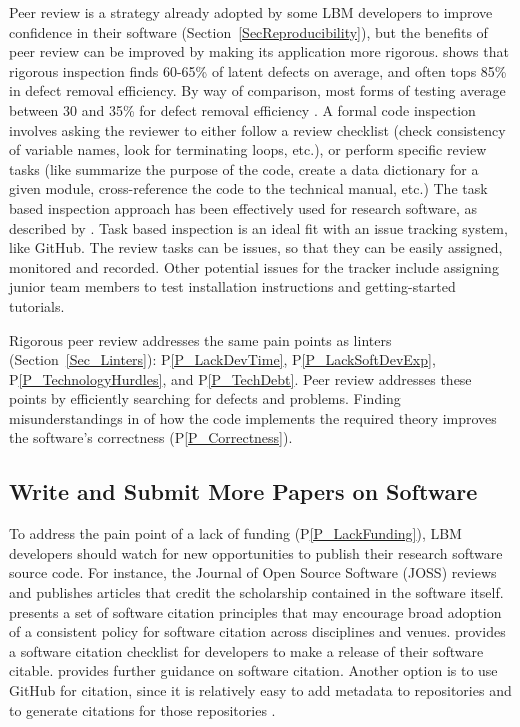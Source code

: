 \documentclass[final, 3p, times, authoryear]{elsarticle}
\newcommand{\ppref}[1]{P\ref{#1}}
\begin{document}
Peer review is a strategy already adopted by some LBM developers to improve
confidence in their software (Section~\ref{SecReproducibility}), but the
benefits of peer review can be improved by making its application more rigorous.
\citet{Jones2008} shows that rigorous inspection finds 60-65\% of latent defects
on average, and often tops 85\% in defect removal efficiency.  By way of
comparison, most forms of testing average between 30 and 35\% for defect removal
efficiency \citep{EbertAndJones2009, Jones2008}.  A formal code inspection
involves asking the reviewer to either follow a review checklist (check
consistency of variable names, look for terminating loops, etc.), or perform
specific review tasks (like summarize the purpose of the code, create a data
dictionary for a given module, cross-reference the code to the technical
manual, etc.) The task based inspection approach has been effectively used for
research software, as described by \citet{KellyAndShepard2000}. Task based
inspection is an ideal fit with an issue tracking system, like GitHub.  The
review tasks can be issues, so that they can be easily assigned, monitored and
recorded.  Other potential issues for the tracker include assigning junior team
members to test installation instructions and getting-started tutorials.

Rigorous peer review addresses the same pain points as linters
(Section~\ref{Sec_Linters}): \ppref{P_LackDevTime}, \ppref{P_LackSoftDevExp},
\ppref{P_TechnologyHurdles}, and \ppref{P_TechDebt}. Peer review addresses these
points by efficiently searching for defects and problems.  Finding
misunderstandings in of how the code implements the required theory improves the
software's correctness (\ppref{P_Correctness}).

\subsection{Write and Submit More Papers on Software} \label{Sec_MorePapers}

To address the pain point of a lack of funding (\ppref{P_LackFunding}), LBM
developers should watch for new opportunities to publish their research software
source code. For instance, the Journal of Open Source Software (JOSS)
\citep{SmithEtAl2018-joss} reviews and publishes articles that credit the
scholarship contained in the software itself.  \citet{SmithEtAl2016-softcite}
presents a set of software citation principles that may encourage broad adoption
of a consistent policy for software citation across disciplines and venues.
\citet{ChueHongEtAl2019} provides a software citation checklist for developers
to make a release of their software citable.  \citet{KatzEtAl2021} provides
further guidance on software citation.  Another option is to use GitHub for
citation, since it is relatively easy to add metadata to repositories and to
generate citations for those repositories \citep{Smith2021-CitationsOnGitHub}.
\end{document}
